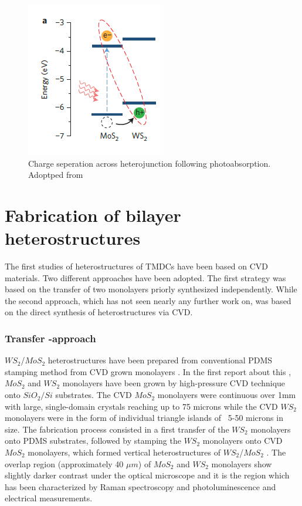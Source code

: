 \begin{figure}[h]
	\begin{center}
		\includegraphics[scale=1]{Heterostructures/HeterostructureChargeSeparationDiagram.png}
		\caption{Charge seperation across heterojunction following photoabsorption. Adoptped from \cite{Hong2014}}
		\label{fig:HeterostructuresChargeSeperationDiagram}
	\end{center}
\end{figure}

\section{Fabrication of bilayer heterostructures}

The first studies of heterostructures of TMDCs have been based on CVD materials. Two different approaches have been adopted. The first strategy was based on the transfer of two monolayers priorly synthesized independently. While the second approach, which has not seen nearly any further work on, was based on the direct synthesis of heterostructures via CVD. 

\subsubsection{Transfer -approach}

$WS_2$/$MoS_2$ heterostructures have been prepared from conventional PDMS stamping method from CVD grown monolayers \cite{Tongay2014}. In the first report about this \cite{Gong2014}, $MoS_2$ and $WS_2$ monolayers have been grown by high-pressure CVD technique onto $SiO_2/Si$ substrates. The CVD $MoS_2$ monolayers were continuous over 1mm with large, single-domain crystals reaching up to 75 microns while the CVD $WS_2$ monolayers were in the form of individual triangle islands of ~5-50 microns in size. 
The fabrication process consisted in a first transfer of the $WS_2$ monolayers onto PDMS substrates, followed by stamping the $WS_2$ monolayers onto CVD $MoS_2$ monolayers, which formed vertical heterostructures of $WS_2$/$MoS_2$ \cite{Tongay2014}. The overlap region (approximately 40 ${\mu}m$) of $MoS_2$ and $WS_2$ monolayers show slightly darker contrast under the optical microscope and it is the region which has been characterized by Raman spectroscopy and photoluminescence and electrical measurements.

